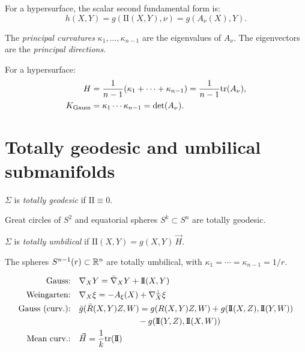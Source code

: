 For a hypersurface, the scalar second fundamental form is:
\[
    h(X, Y) = g(\mathrm{I\!I}(X, Y), \nu) = g(A_\nu(X), Y).
\]

\begin{definition}
The \emph{principal curvatures} $\kappa_1, \ldots, \kappa_{n-1}$ are the eigenvalues
of $A_\nu$. The eigenvectors are the \emph{principal directions}.
\end{definition}

\begin{proposition}
For a hypersurface:
\begin{align*}
    H &= \frac{1}{n-1}(\kappa_1 + \cdots + \kappa_{n-1})
       = \frac{1}{n-1} \mathrm{tr}(A_\nu), \\
    K_{\text{Gauss}} &= \kappa_1 \cdots \kappa_{n-1} = \det(A_\nu).
\end{align*}
\end{proposition}

\section{Totally geodesic and umbilical submanifolds}

\begin{definition}
$\Sigma$ is \emph{totally geodesic} if $\mathrm{I\!I} \equiv 0$.
\end{definition}

\begin{example}
Great circles of $S^2$ and equatorial spheres $S^k \subset S^n$ are totally geodesic.
\end{example}

\begin{definition}
$\Sigma$ is \emph{totally umbilical} if $\mathrm{I\!I}(X, Y) = g(X, Y)\, \vec{H}$.
\end{definition}

\begin{example}
The spheres $S^{n-1}(r) \subset \mathbb{R}^n$ are totally umbilical, with
$\kappa_1 = \cdots = \kappa_{n-1} = 1/r$.
\end{example}

\begin{keyformulas}[title=\textbf{Fundamental formulas for submanifolds}]
\begin{align*}
    \text{Gauss:} \quad & \nabla_X Y = \bar{\nabla}_X Y + \mathrm{I\!I}(X, Y) \\
    \text{Weingarten:} \quad & \nabla_X \xi = -A_\xi(X) + \nabla_X^\perp \xi \\
    \text{Gauss (curv.):} \quad & \bar{g}(\bar{R}(X,Y)Z, W) = g(R(X,Y)Z, W)
        + g(\mathrm{I\!I}(X,Z), \mathrm{I\!I}(Y,W)) \\
    & \qquad\qquad\qquad\quad - g(\mathrm{I\!I}(Y,Z), \mathrm{I\!I}(X,W)) \\
    \text{Mean curv.:} \quad & \vec{H} = \frac{1}{k}\mathrm{tr}(\mathrm{I\!I})
\end{align*}
\end{keyformulas}

